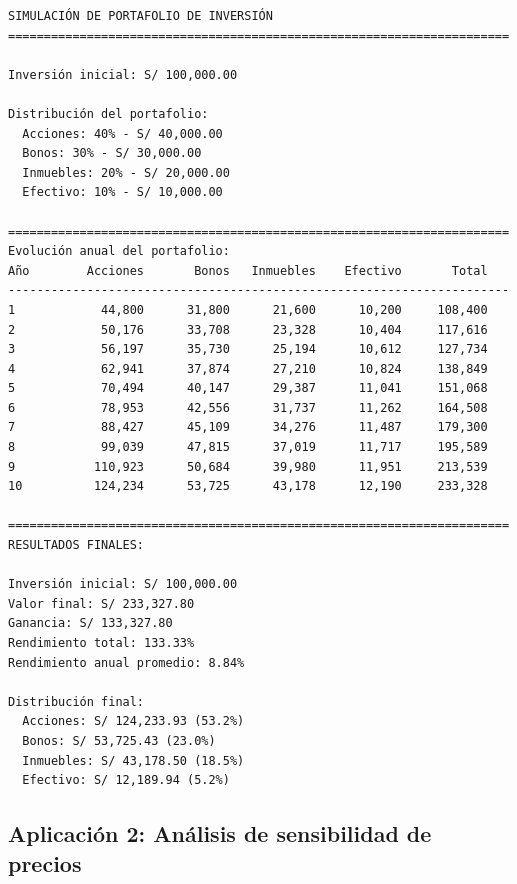 \documentclass[
  doc,
  floatsintext,
  longtable,
  a4paper,
  nolmodern,
  notxfonts,
  notimes,
  12pt,
  colorlinks=true,linkcolor=blue,citecolor=blue,urlcolor=blue]{apa7}
\begin{document}
\begin{verbatim}
SIMULACIÓN DE PORTAFOLIO DE INVERSIÓN
======================================================================

Inversión inicial: S/ 100,000.00

Distribución del portafolio:
  Acciones: 40% - S/ 40,000.00
  Bonos: 30% - S/ 30,000.00
  Inmuebles: 20% - S/ 20,000.00
  Efectivo: 10% - S/ 10,000.00

======================================================================
Evolución anual del portafolio:
Año        Acciones       Bonos   Inmuebles    Efectivo       Total
----------------------------------------------------------------------
1            44,800      31,800      21,600      10,200     108,400
2            50,176      33,708      23,328      10,404     117,616
3            56,197      35,730      25,194      10,612     127,734
4            62,941      37,874      27,210      10,824     138,849
5            70,494      40,147      29,387      11,041     151,068
6            78,953      42,556      31,737      11,262     164,508
7            88,427      45,109      34,276      11,487     179,300
8            99,039      47,815      37,019      11,717     195,589
9           110,923      50,684      39,980      11,951     213,539
10          124,234      53,725      43,178      12,190     233,328

======================================================================
RESULTADOS FINALES:

Inversión inicial: S/ 100,000.00
Valor final: S/ 233,327.80
Ganancia: S/ 133,327.80
Rendimiento total: 133.33%
Rendimiento anual promedio: 8.84%

Distribución final:
  Acciones: S/ 124,233.93 (53.2%)
  Bonos: S/ 53,725.43 (23.0%)
  Inmuebles: S/ 43,178.50 (18.5%)
  Efectivo: S/ 12,189.94 (5.2%)
\end{verbatim}

\subsection{Aplicación 2: Análisis de sensibilidad de
precios}\label{aplicaciuxf3n-2-anuxe1lisis-de-sensibilidad-de-precios}
\end{document}
